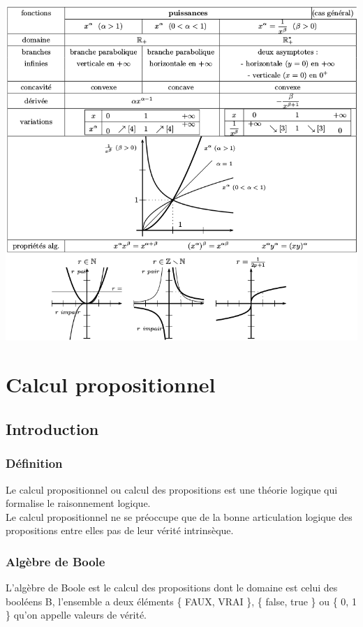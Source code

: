 \documentclass[a4paper,10pt]{book}
\begin{document}
\begin{center} \includegraphics[scale=0.3]{images/005.png} \end{center}

\chapter{Calcul propositionnel}
\section{Introduction}
\subsection{Définition}
Le calcul propositionnel ou calcul des propositions est une théorie logique qui formalise le raisonnement logique.\\

Le calcul propositionnel ne se préoccupe que de la bonne articulation logique des propositions entre elles pas de leur vérité intrinsèque.\\

\subsection{Algèbre de Boole}
L’algèbre de Boole est le calcul des propositions dont le domaine est celui des booléens B, l’ensemble a deux éléments \{ FAUX, VRAI \}, \{ false, true \} ou \{ 0, 1 \} qu’on appelle valeurs de vérité.\\
\end{document}
